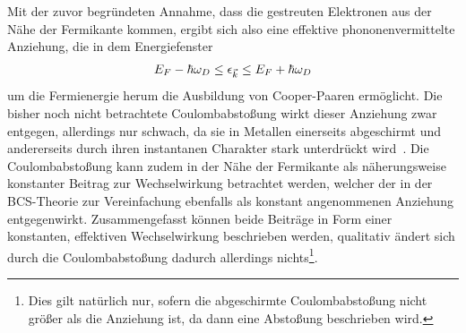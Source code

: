 

Mit der zuvor begründeten Annahme, dass die gestreuten Elektronen aus der Nähe der Fermikante kommen, ergibt sich also eine effektive phononenvermittelte Anziehung, die in dem Energiefenster
\begin{align}
    E_F - \hbar \omega_D \leq \epsilon_{\vec{k}} \leq E_F + \hbar \omega_D
\end{align}
um die Fermienergie herum die Ausbildung von Cooper-Paaren ermöglicht.
Die bisher noch nicht betrachtete Coulombabstoßung wirkt dieser Anziehung zwar entgegen, allerdings nur schwach, da sie in Metallen einerseits abgeschirmt und andererseits durch ihren instantanen Charakter stark unterdrückt wird~\cite{morel_calculation_1962,althuser_collective_2025}. 
Die Coulombabstoßung kann zudem in der Nähe der Fermikante als näherungsweise konstanter Beitrag zur Wechselwirkung betrachtet werden, welcher der in der BCS-Theorie zur Vereinfachung ebenfalls als konstant angenommenen Anziehung entgegenwirkt. 
Zusammengefasst können beide Beiträge in Form einer konstanten, effektiven Wechselwirkung beschrieben werden, qualitativ ändert sich durch die Coulombabstoßung dadurch allerdings nichts\footnote{Dies gilt natürlich nur, sofern die abgeschirmte Coulombabstoßung nicht größer als die Anziehung ist, da dann eine Abstoßung beschrieben wird.}.

